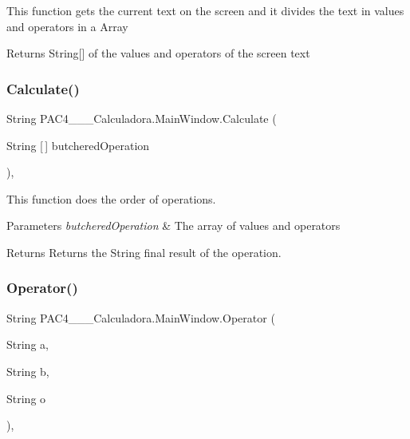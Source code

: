 This function gets the current text on the screen and it divides the text in values and operators in a Array 

\begin{DoxyReturn}{Returns}
String\mbox{[}\mbox{]} of the values and operators of the screen text
\end{DoxyReturn}
\mbox{\label{class_p_a_c4_______calculadora_1_1_main_window_a58ba74bda855d9a8ce9425450a703dd6}} 
\subsubsection{\texorpdfstring{Calculate()}{Calculate()}}
{\footnotesize\ttfamily String P\+A\+C4\+\_\+\+\_\+\+\_\+\+Calculadora.\+Main\+Window.\+Calculate (\begin{DoxyParamCaption}\item[{String \mbox{[}$\,$\mbox{]}}]{butchered\+Operation }\end{DoxyParamCaption})\hspace{0.3cm}{\ttfamily [inline]}, {\ttfamily [private]}}



This function does the order of operations. 


\begin{DoxyParams}{Parameters}
{\em butchered\+Operation} & The array of values and operators\\
\hline
\end{DoxyParams}
\begin{DoxyReturn}{Returns}
Returns the String final result of the operation.
\end{DoxyReturn}
\mbox{\label{class_p_a_c4_______calculadora_1_1_main_window_a563642c8d66bce5c42fb1e283c8daedb}} 
\subsubsection{\texorpdfstring{Operator()}{Operator()}}
{\footnotesize\ttfamily String P\+A\+C4\+\_\+\+\_\+\+\_\+\+Calculadora.\+Main\+Window.\+Operator (\begin{DoxyParamCaption}\item[{String}]{a,  }\item[{String}]{b,  }\item[{String}]{o }\end{DoxyParamCaption})\hspace{0.3cm}{\ttfamily [inline]}, {\ttfamily [private]}}



